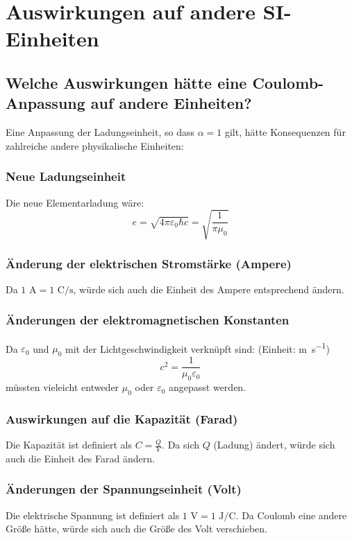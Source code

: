 \documentclass{article}
\begin{document}
	\section{Auswirkungen auf andere SI-Einheiten}
	
	\subsection{ Welche Auswirkungen hätte eine Coulomb-Anpassung auf andere Einheiten?}
	
	Eine Anpassung der Ladungseinheit, so dass $\alpha = 1$ gilt, hätte Konsequenzen für zahlreiche andere physikalische Einheiten:
	
	\subsubsection{Neue Ladungseinheit}
	Die neue Elementarladung wäre:
	$$e = \sqrt{4\pi\varepsilon_0\hbar c} = \sqrt{\frac{1}{\pi \mu_0}}$$
	
	\subsubsection{Änderung der elektrischen Stromstärke (Ampere)}
	Da $1 \text{ A} = 1 \text{ C}/\text{s}$, würde sich auch die Einheit des Ampere entsprechend ändern.
	
	\subsubsection{Änderungen der elektromagnetischen Konstanten}
	Da $\varepsilon_0$ und $\mu_0$ mit der Lichtgeschwindigkeit verknüpft sind:
	(Einheit: \si{\meter\per\second})	$$c^2 = \frac{1}{\mu_0\varepsilon_0}$$
	müssten vieleicht entweder $\mu_0$ oder $\varepsilon_0$ angepasst werden.
	
	\subsubsection{Auswirkungen auf die Kapazität (Farad)}
	Die Kapazität ist definiert als $C = \frac{Q}{V}$. Da sich $Q$ (Ladung) ändert, würde sich auch die Einheit des Farad ändern.
	
	\subsubsection{Änderungen der Spannungseinheit (Volt)}
	Die elektrische Spannung ist definiert als $1 \text{ V} = 1 \text{ J}/\text{C}$. Da Coulomb eine andere Größe hätte, würde sich auch die Größe des Volt verschieben.
	
\end{document}
